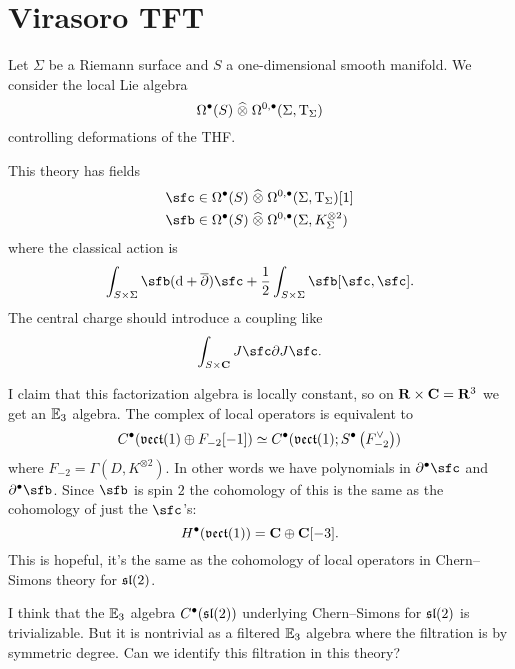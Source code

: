 \documentclass[11pt]{amsart}
\begin{document}
\section{Virasoro TFT}

Let $\Sigma$ be a Riemann surface and $S$ a one-dimensional smooth manifold.
We consider the local Lie algebra
\begin{equation}
\Omega^\bullet(S) \; \widehat{\otimes} \; \Omega^{0,\bullet}(\Sigma, {\rm T}_{\Sigma}) 
\end{equation}
controlling deformations of the THF.

This theory has fields
\begin{align*}
\sfc & \in \Omega^\bu(S) \hotimes \Omega^{0,\bu}(\Sigma, \T_\Sigma)[1] \\
\sfb & \in \Omega^\bu(S) \hotimes \Omega^{0,\bu}(\Sigma, K_\Sigma^{\otimes 2})
\end{align*}
where the classical action is 
\begin{equation}
\int_{S \times \Sigma} \sfb (\d + \dbar) \sfc + \frac12 \int_{S \times \Sigma} \sfb [\sfc,\sfc] .
\end{equation}
The central charge should introduce a coupling like
\begin{equation}
\int_{S \times \C} J \sfc \del J \sfc .
\end{equation}

I claim that this factorization algebra is locally constant, so on $\mathbf{R} \times \mathbf{C} = \mathbf{R}^3$ we get an $\mathbb E_3$ algebra.
The complex of local operators is equivalent to
\begin{equation}
C^\bullet(\mathfrak{vect}(1) \oplus F_{-2}[-1]) \simeq C^\bullet(\mathfrak{vect}(1) ; S^\bullet \left(F^\vee_{-2}\right))
\end{equation}
where $F_{-2} = \Gamma(D, K^{\otimes 2})$.
In other words we have polynomials in $\del^\bu \sfc$ and $\del^\bu \sfb$.
Since $\sfb$ is spin $2$ the cohomology of this is the same as the cohomology of just the $\sfc$'s:
\begin{equation}
H^\bullet(\mathfrak{vect}(1)) = \mathbf{C} \oplus \mathbf{C}[-3] .
\end{equation}
This is hopeful, it's the same as the cohomology of local operators in Chern--Simons theory for $\mathfrak{sl}(2)$.

I think that the $\mathbb E_3$ algebra $C^\bullet(\mathfrak{sl}(2))$ underlying Chern--Simons for $\mathfrak{sl}(2)$ is trivializable.
But it is nontrivial as a filtered $\mathbb E_3$ algebra where the filtration is by symmetric degree.
Can we identify this filtration in this theory?
\end{document}
